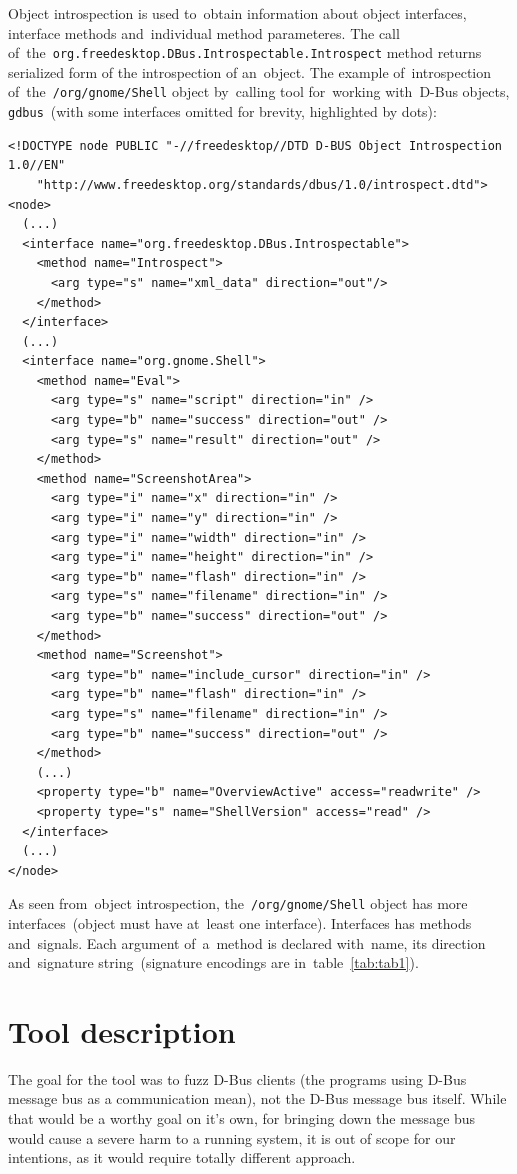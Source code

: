 \documentclass[conference]{IEEEtran}
\begin{document}
Object introspection is used to~obtain information about object interfaces,
interface methods and~individual method parameteres. The call
of~the~\texttt{org.freedesktop.DBus.Introspectable.Introspect} method returns
serialized form of the introspection of an~object. The example of~introspection
of~the~\texttt{/org/gnome/Shell} object by~calling tool for~working with~D-Bus
objects, \texttt{gdbus}~(with some interfaces omitted for brevity, highlighted
by dots):
\begin{verbatim}
<!DOCTYPE node PUBLIC "-//freedesktop//DTD D-BUS Object Introspection 1.0//EN"
    "http://www.freedesktop.org/standards/dbus/1.0/introspect.dtd">
<node>
  (...)
  <interface name="org.freedesktop.DBus.Introspectable">
    <method name="Introspect">
      <arg type="s" name="xml_data" direction="out"/>
    </method>
  </interface>
  (...)
  <interface name="org.gnome.Shell">
    <method name="Eval">
      <arg type="s" name="script" direction="in" />
      <arg type="b" name="success" direction="out" />
      <arg type="s" name="result" direction="out" />
    </method>
    <method name="ScreenshotArea">
      <arg type="i" name="x" direction="in" />
      <arg type="i" name="y" direction="in" />
      <arg type="i" name="width" direction="in" />
      <arg type="i" name="height" direction="in" />
      <arg type="b" name="flash" direction="in" />
      <arg type="s" name="filename" direction="in" />
      <arg type="b" name="success" direction="out" />
    </method>
    <method name="Screenshot">
      <arg type="b" name="include_cursor" direction="in" />
      <arg type="b" name="flash" direction="in" />
      <arg type="s" name="filename" direction="in" />
      <arg type="b" name="success" direction="out" />
    </method>
    (...)
    <property type="b" name="OverviewActive" access="readwrite" />
    <property type="s" name="ShellVersion" access="read" />
  </interface>
  (...)
</node>
\end{verbatim}

As seen from~object introspection, the~\texttt{/org/gnome/Shell} object has more
interfaces~(object must have at~least one interface). Interfaces has methods
and~signals. Each argument of~a~method is declared with~name, its direction
and~signature string~(signature encodings are in~table~\ref{tab:tab1}).


\section{Tool description}
The goal for the tool was to fuzz D-Bus clients (the programs using D-Bus
message bus as a communication mean), not the D-Bus message bus itself. While
that would be a worthy goal on it's own, for bringing down the message bus
would cause a severe harm to a running system, it is out of scope for our
intentions, as it would require totally different approach.
\end{document}
